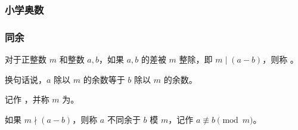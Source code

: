 \documentclass{../pkslide}
\newcommand{\nequiv}{\not\equiv} %
\begin{document}
\subsubsection{小学奥数}


\begin{frame}
  \frametitle{同余}
  
  \begin{definition}[同余和模]
    对于正整数 $m$ 和整数 $a, b$，如果 $a, b$ 的差被 $m$ 整除，即 $m \mid (a - b)$，则称 。
    
    换句话说，$a$ 除以 $m$ 的余数等于 $b$ 除以 $m$ 的余数。
    
    记作 ，并称 $m$ 为。
    
    如果 $m \nmid (a - b)$，则称 $a$ 不同余于 $b$ 模 $m$，记作 $a \nequiv b \pmod{m}$。
    
    
  \end{definition}
\end{frame}
\end{document}
